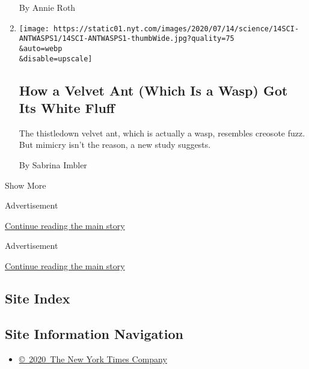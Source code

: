 \begin{enumerate}
  By Annie Roth
\item
  \href{/2020/07/14/science/white-fluffy-ant-wasp.html}{}

  \texttt{[image: https://static01.nyt.com/images/2020/07/14/science/14SCI-ANTWASPS1/14SCI-ANTWASPS1-thumbWide.jpg?quality=75\\\&auto=webp\\\&disable=upscale]}

  \hypertarget{how-a-velvet-ant-which-is-a-wasp-got-its-white-fluff}{%
  \subsection{How a Velvet Ant (Which Is a Wasp) Got Its White
  Fluff}\label{how-a-velvet-ant-which-is-a-wasp-got-its-white-fluff}}

  The thistledown velvet ant, which is actually a wasp, resembles
  creosote fuzz. But mimicry isn't the reason, a new study suggests.

  By Sabrina Imbler
\end{enumerate}

Show More

Advertisement

\protect\hyperlink{after-mid1}{Continue reading the main story}

Advertisement

\protect\hyperlink{after-mktg}{Continue reading the main story}

\hypertarget{site-index}{%
\subsection{Site Index}\label{site-index}}

\hypertarget{site-information-navigation}{%
\subsection{Site Information
Navigation}\label{site-information-navigation}}

\begin{itemize}
\tightlist
\item
  \href{https://help.nytimes.com/hc/en-us/articles/115014792127-Copyright-notice}{©~2020~The
  New York Times Company}
\end{itemize}

